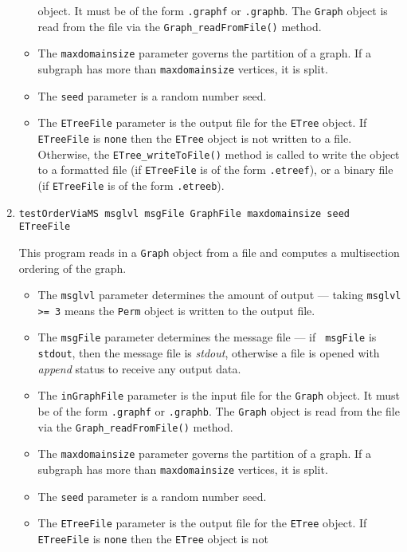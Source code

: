 \begin{enumerate}
\begin{itemize}
object. It must be of the form {\tt *.graphf} or {\tt *.graphb}.
The {\tt Graph} object is read from the file via the
{\tt Graph\_readFromFile()} method.
\item
The {\tt maxdomainsize} parameter governs the partition of a graph.
If a subgraph has more than {\tt maxdomainsize} vertices, it is
split.
\item
The {\tt seed} parameter is a random number seed.
\item
The {\tt ETreeFile} parameter is the output file for the {\tt ETree}
object. 
If {\tt ETreeFile} is {\tt none} then the {\tt ETree} object is not
written to a file. 
Otherwise, the {\tt ETree\_writeToFile()} method is called to write
the object to 
a formatted file (if {\tt ETreeFile} is of the form {\tt *.etreef}),
or
a binary file (if {\tt ETreeFile} is of the form {\tt *.etreeb}).
\end{itemize}
\item
\begin{verbatim}
testOrderViaMS msglvl msgFile GraphFile maxdomainsize seed ETreeFile
\end{verbatim}
This program reads in a {\tt Graph} object from a file and computes
a multisection ordering of the graph.
\par
\begin{itemize}
\item
The {\tt msglvl} parameter determines the amount of output ---
taking {\tt msglvl >= 3} means the {\tt Perm} object is written
to the output file.
\item
The {\tt msgFile} parameter determines the message file --- if {\tt
msgFile} is {\tt stdout}, then the message file is {\it stdout},
otherwise a file is opened with {\it append} status to receive any
output data.
\item
The {\tt inGraphFile} parameter is the input file for the {\tt Graph}
object. It must be of the form {\tt *.graphf} or {\tt *.graphb}.
The {\tt Graph} object is read from the file via the
{\tt Graph\_readFromFile()} method.
\item
The {\tt maxdomainsize} parameter governs the partition of a graph.
If a subgraph has more than {\tt maxdomainsize} vertices, it is
split.
\item
The {\tt seed} parameter is a random number seed.
\item
The {\tt ETreeFile} parameter is the output file for the {\tt ETree}
object. 
If {\tt ETreeFile} is {\tt none} then the {\tt ETree} object is not

\end{itemize}
\end{enumerate}
